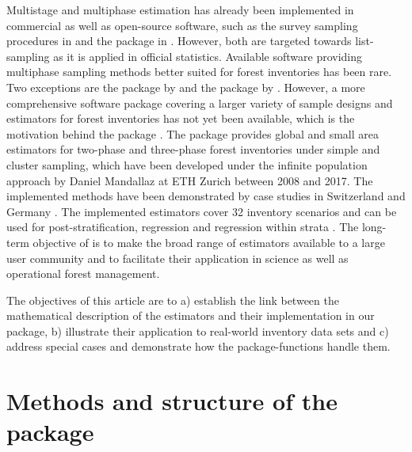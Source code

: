 \documentclass[article]{jss}
\begin{document}
Multistage and multiphase estimation has already been implemented in commercial as well as open-source software, such as the survey sampling procedures in  \citep{sas} and the  package in  \citep{survey}. However, both are targeted towards list-sampling as it is applied in official statistics. Available software providing multiphase sampling methods better suited for forest inventories has been rare. Two exceptions are the  package  by \citet{josae2015} and the  package by \citet{cullmann2016}. However, a more comprehensive software package covering a larger variety of sample designs and estimators for forest inventories has not yet been available, which is the motivation behind the  package . The package provides global and small area estimators for two-phase and three-phase forest inventories under simple and cluster sampling, which have been developed under the infinite population approach by Daniel Mandallaz at ETH Zurich between 2008 and 2017. The implemented methods have been demonstrated by case studies in Switzerland \citep{massey2014a, massey2015b, mandallaz2013b} and Germany \citep{hill2018b}. The implemented estimators cover 32 inventory scenarios and can be used for post-stratification, regression and regression within strata \citep{massey2015}. The long-term objective of  is to make the broad range of estimators available to a large user community and to facilitate their application in science as well as operational forest management.

The objectives of this article are to a) establish the link between the mathematical description of the estimators and their implementation in our package, b) illustrate their application to real-world inventory data sets and c) address special cases and demonstrate how the package-functions handle them.

 
 \newpage
 
 




\section{Methods and structure of the package}
\label{sec:str_and_mod}
\end{document}
